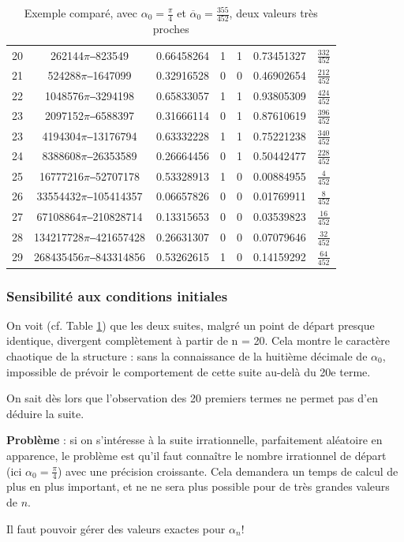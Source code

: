 \documentclass{scrartcl}
\begin{document}
\begin{table}
\begin{tabular}{|*{7}{c|}}
20 & 262144$\pi$‒823549 & 0.66458264 & 1 & 1 & 0.73451327 & $\frac{332}{452}$ \\
21 & 524288$\pi$‒1647099 & 0.32916528 & 0 & 0 & 0.46902654 & $\frac{212}{452}$ \\
22 & 1048576$\pi$‒3294198 & 0.65833057 & 1 & 1 & 0.93805309 & $\frac{424}{452}$ \\
23 & 2097152$\pi$‒6588397 & 0.31666114 & 0 & 1 & 0.87610619 & $\frac{396}{452}$ \\
23 & 4194304$\pi$‒13176794 & 0.63332228 & 1 & 1 & 0.75221238 & $\frac{340}{452}$ \\
24 & 8388608$\pi$‒26353589 & 0.26664456 & 0 & 1 & 0.50442477 & $\frac{228}{452}$ \\
25 & 16777216$\pi$‒52707178 & 0.53328913 & 1 & 0 & 0.00884955 & $\frac{4}{452}$ \\
26 & 33554432$\pi$‒105414357 & 0.06657826 & 0 & 0 & 0.01769911 & $\frac{8}{452}$ \\
27 & 67108864$\pi$‒210828714 & 0.13315653 & 0 & 0 & 0.03539823 & $\frac{16}{452}$ \\
28 & 134217728$\pi$‒421657428 & 0.26631307 & 0 & 0 & 0.07079646 & $\frac{32}{452}$ \\
29 & 268435456$\pi$‒843314856 & 0.53262615 & 1 & 0 & 0.14159292 & $\frac{64}{452}$ \\
\end{tabular}
\caption{Exemple comparé, avec $\alpha_0 = \frac{\pi}{4}$ et
  $\overline{\alpha}_0 = \frac{355}{452}$, deux valeurs très proches
  \label{t:chaos}
}
\end{table}

\subsubsection{Sensibilité aux conditions initiales}
On voit (cf. Table \ref{t:chaos}) que les deux suites, malgré un point de départ
presque identique, divergent complètement à partir de n = 20. Cela montre le
caractère chaotique de la structure : sans la connaissance de la huitième
décimale de $\alpha_0$, impossible de prévoir le comportement de cette suite
au-delà du 20e terme.\par
On sait dès lors que l’observation des 20 premiers termes ne permet pas d’en
déduire la suite.\par
\par
\textbf{Problème} : si on s’intéresse à la suite irrationnelle, parfaitement
aléatoire en apparence, le problème est qu’il faut connaître le nombre
irrationnel de départ (ici $\alpha_0 = \frac{\pi}{4}$) avec une précision
croissante. Cela demandera un temps de calcul de plus en plus important, et ne
ne sera plus possible pour de très grandes valeurs de $n$. \par
Il faut pouvoir gérer des valeurs exactes pour $\alpha_n$!
\end{document}
